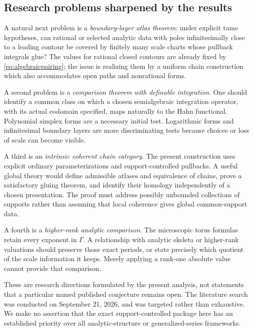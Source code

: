 \documentclass[11pt,letterpaper]{article}
\theoremstyle{definition}
\theoremstyle{remark}
\numberwithin{equation}{section}
\begin{document}
\subsection{Research problems sharpened by the results}
A natural next problem is a \emph{boundary-layer atlas theorem}: under explicit tame hypotheses, can rational or selected analytic data with poles infinitesimally close to a leading contour be covered by finitely many scale charts whose pullback integrals glue? The values for rational closed contours are already fixed by \eqref{eq:algebraicpairing}; the issue is realizing them by a uniform chain construction which also accommodates open paths and nonrational forms.

A second problem is a \emph{comparison theorem with definable integration}. One should identify a common class on which a chosen semialgebraic integration operator, with its actual codomain specified, maps naturally to the Hahn functional. Polynomial simplex forms are a necessary initial test. Logarithmic forms and infinitesimal boundary layers are more discriminating tests because choices or loss of scale can become visible.

A third is an \emph{intrinsic coherent chain category}. The present construction uses explicit ordinary parameterizations and support-controlled pullbacks. A useful global theory would define admissible atlases and equivalence of chains, prove a satisfactory gluing theorem, and identify their homology independently of a chosen presentation. The proof must address possibly unbounded collections of supports rather than assuming that local coherence gives global common-support data.

A fourth is a \emph{higher-rank analytic comparison}. The microscopic torus formulas retain every exponent in $\Gamma$. A relationship with analytic skeleta or higher-rank valuations should preserve those exact periods, or state precisely which quotient of the scale information it keeps. Merely applying a rank-one absolute value cannot provide that comparison.

These are research directions formulated by the present analysis, not statements that a particular named published conjecture remains open. The literature search was conducted on September 21, 2026, and was targeted rather than exhaustive. We make no assertion that the exact support-controlled package here has an established priority over all analytic-structure or generalized-series frameworks.
\end{document}
